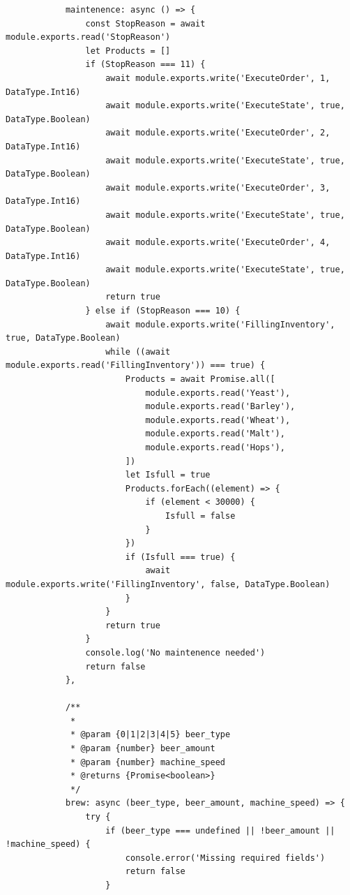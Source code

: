 \begin{center}
\begin{verbatim}
            maintenence: async () => {
                const StopReason = await module.exports.read('StopReason')
                let Products = []
                if (StopReason === 11) {
                    await module.exports.write('ExecuteOrder', 1, DataType.Int16)
                    await module.exports.write('ExecuteState', true, DataType.Boolean)
                    await module.exports.write('ExecuteOrder', 2, DataType.Int16)
                    await module.exports.write('ExecuteState', true, DataType.Boolean)
                    await module.exports.write('ExecuteOrder', 3, DataType.Int16)
                    await module.exports.write('ExecuteState', true, DataType.Boolean)
                    await module.exports.write('ExecuteOrder', 4, DataType.Int16)
                    await module.exports.write('ExecuteState', true, DataType.Boolean)
                    return true
                } else if (StopReason === 10) {
                    await module.exports.write('FillingInventory', true, DataType.Boolean)
                    while ((await module.exports.read('FillingInventory')) === true) {
                        Products = await Promise.all([
                            module.exports.read('Yeast'),
                            module.exports.read('Barley'),
                            module.exports.read('Wheat'),
                            module.exports.read('Malt'),
                            module.exports.read('Hops'),
                        ])
                        let Isfull = true
                        Products.forEach((element) => {
                            if (element < 30000) {
                                Isfull = false
                            }
                        })
                        if (Isfull === true) {
                            await module.exports.write('FillingInventory', false, DataType.Boolean)
                        }
                    }
                    return true
                }
                console.log('No maintenence needed')
                return false
            },

            /**
             *
             * @param {0|1|2|3|4|5} beer_type
             * @param {number} beer_amount
             * @param {number} machine_speed
             * @returns {Promise<boolean>}
             */
            brew: async (beer_type, beer_amount, machine_speed) => {
                try {
                    if (beer_type === undefined || !beer_amount || !machine_speed) {
                        console.error('Missing required fields')
                        return false
                    }


\end{verbatim}
\end{center}
